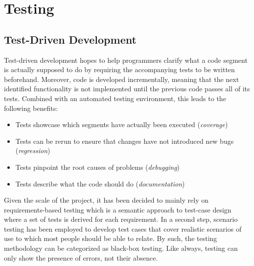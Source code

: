 
\chapter{Testing}
\label{chp:testing}

\section{Test-Driven Development}
\label{sec:TDD}
Test-driven development hopes to help programmers clarify what a code segment is actually supposed to do by requiring the accompanying tests to be written beforehand. Moreover, code is developed incrementally, meaning that the next identified functionality is not implemented until the previous code passes all of its tests. Combined with an automated testing environment, this leads to the following benefits:

\begin{itemize}
  \item Tests showcase which segments have actually been executed (\textit{coverage})
  \item Tests can be rerun to ensure that changes have not introduced new bugs (\textit{regression})
  \item Tests pinpoint the root causes of problems (\textit{debugging})
  \item Tests describe what the code should do (\textit{documentation})
\end{itemize}

Given the scale of the project, it has been decided to mainly rely on requirements-based testing which is a semantic approach to test-case design where a set of tests is derived for each requirement. In a second step, scenario testing has been employed to develop test cases that cover realistic scenarios of use to which most people should be able to relate. By such, the testing methodology can be categorized as black-box testing. Like always, testing can only show the presence of errors, not their absence. 



